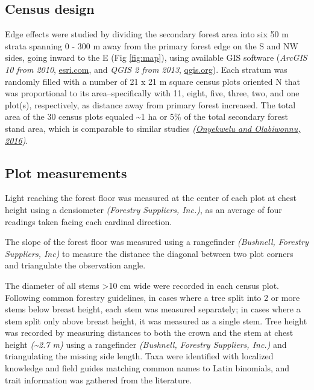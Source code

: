 \documentclass[
  12pt,
]{article}
\begin{document}
\hypertarget{census-design}{%
\subsection{Census design}\label{census-design}}

Edge effects were studied by dividing the secondary forest area into six 50 m strata spanning 0 - 300 m away from the primary forest edge on the S and NW sides, going inward to the E (Fig \ref{fig:map}), using available GIS software (\emph{ArcGIS 10 from 2010}, \url{esri.com}, and \emph{QGIS 2 from 2013}, \url{qgis.org}).
Each stratum was randomly filled with a number of 21 x 21 m square census plots oriented N that was proportional to its area--specifically with 11, eight, five, three, two, and one plot(s), respectively, as distance away from primary forest increased.
The total area of the 30 census plots equaled \textasciitilde1 ha or 5\% of the total secondary forest stand area, which is comparable to similar studies \emph{(\protect\hyperlink{ref-onyekwelu16}{Onyekwelu and Olabiwonnu, 2016})}.

\hypertarget{plot-measurements}{%
\subsection{Plot measurements}\label{plot-measurements}}

Light reaching the forest floor was measured at the center of each plot at chest height using a densiometer \emph{(Forestry Suppliers, Inc.)}, as an average of four readings taken facing each cardinal direction.

The slope of the forest floor was measured using a rangefinder \emph{(Bushnell, Forestry Suppliers, Inc)} to measure the distance the diagonal between two plot corners and triangulate the observation angle.

The diameter of all stems \textgreater10 cm wide were recorded in each census plot.
Following common forestry guidelines, in cases where a tree split into 2 or more stems below breast height, each stem was measured separately; in cases where a stem split only above breast height, it was measured as a single stem.
Tree height was recorded by measuring distances to both the crown and the stem at chest height \emph{(\textasciitilde2.7 m)} using a rangefinder \emph{(Bushnell, Forestry Suppliers, Inc.)} and triangulating the missing side length.
Taxa were identified with localized knowledge and field guides matching common names to Latin binomials,
and trait information was gathered from the literature.
\end{document}
